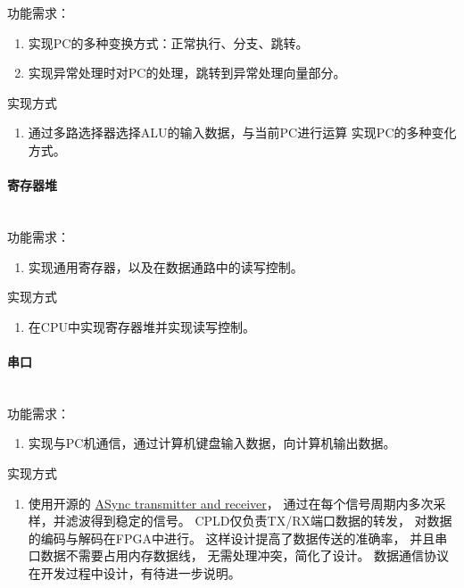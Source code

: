                 功能需求：
                \begin{enumerate}
                \item
                实现PC的多种变换方式：正常执行、分支、跳转。
                \item
                实现异常处理时对PC的处理，跳转到异常处理向量部分。
                \end{enumerate}

                实现方式
                \begin{enumerate}
                \item
                通过多路选择器选择ALU的输入数据，与当前PC进行运算%
                实现PC的多种变化方式。
                \end{enumerate}

            \paragraph{寄存器堆}
                \mbox{} \\ 

                功能需求：
                \begin{enumerate}
                \item
                实现通用寄存器，以及在数据通路中的读写控制。
                \end{enumerate}

                实现方式
                \begin{enumerate}
                \item
                在CPU中实现寄存器堆并实现读写控制。
                \end{enumerate}

            \paragraph{串口}
                \mbox{} \\

                功能需求：
                \begin{enumerate}
                \item
                实现与PC机通信，通过计算机键盘输入数据，向计算机输出数据。
                \end{enumerate}

                实现方式
                \begin{enumerate}
                \item
                使用开源的%
                \href{http://www.fpga4fun.com/SerialInterface.html}{ASync transmitter and receiver}，%
                通过在每个信号周期内多次采样，并滤波得到稳定的信号。%
                CPLD仅负责TX/RX端口数据的转发，%
                对数据的编码与解码在FPGA中进行。%
                这样设计提高了数据传送的准确率，%
                并且串口数据不需要占用内存数据线，%
                无需处理冲突，简化了设计。%
                数据通信协议在开发过程中设计，有待进一步说明。

                \end{enumerate}
